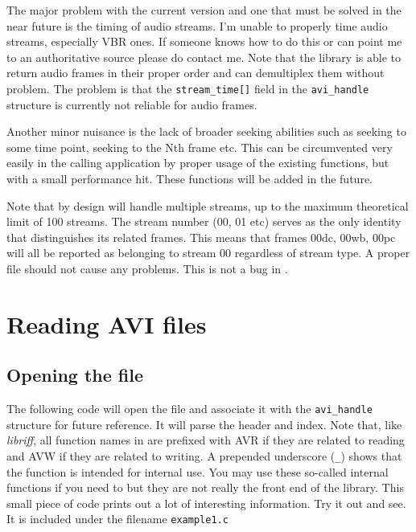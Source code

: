 \documentclass[12pt, a4paper]{article}
\begin{document}
The major problem with the current version and one that must be solved in the near
future is the timing of audio streams. I'm unable to properly time audio streams,
especially {\kapitalakia VBR} ones. If someone knows how to do this or can point
me to an authoritative source please do contact me. Note that the library is
able to return audio frames in their proper order and can demultiplex them
without problem. The problem is that the \verb+stream_time[]+ field in the \verb+avi_handle+
structure is currently not reliable for audio frames.

Another minor nuisance is the lack of broader seeking abilities such as seeking
to some time point, seeking to the Nth frame etc. This can be circumvented very
easily in the calling application by proper usage of the existing functions, but
with a small performance hit. These functions will be added in the future.

Note that by design \libavi{} will handle multiple streams, up to the maximum
theoretical limit of 100 streams. The stream number (00, 01 etc) serves as
the only identity that distinguishes its related frames. This means that
frames 00dc, 00wb, 00pc will all be reported as belonging to stream 00 
regardless of stream type. A proper \AVI{} file should not cause any problems.
This is not a bug in \libavi{}.

\section{Reading AVI files}

\subsection{Opening the file}
The following code will open the file and associate it with the \verb+avi_handle+ 
structure for future reference. It will parse the header and index.
Note that, like \emph{libriff}, all function names in \libavi{} are prefixed
with {\kapitalakia AVR} if they are related to reading and {\kapitalakia AVW}
if they are related to writing. A prepended underscore (\verb+_+) shows that
the function is intended for internal use. You may use these so-called internal
functions if you need to but they are not really the front end of the library.
This small piece of code prints out a lot of interesting information.
Try it out and see. It is included under the filename \verb+example1.c+


\end{document}
